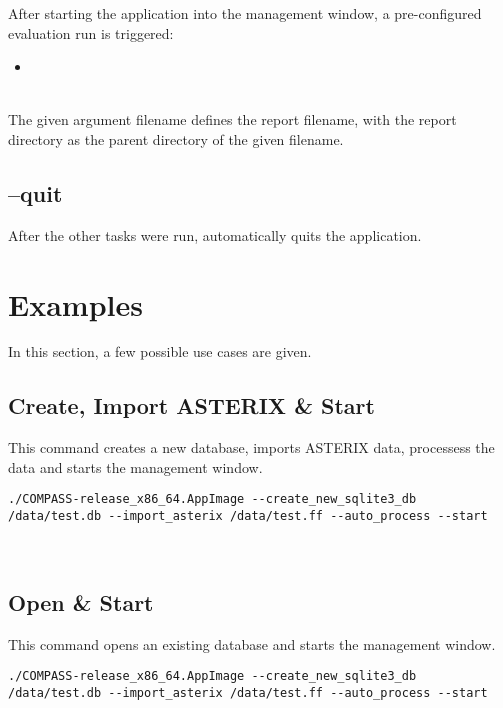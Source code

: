 After starting the application into the management window, a pre-configured evaluation run is triggered:

\begin{itemize}
 \item {}
\end{itemize}
\ \\

The given argument filename defines the report filename, with the report directory as the parent directory of the given filename.

\subsection{--quit}

After the other tasks were run, automatically quits the application.

\section{Examples}

In this section, a few possible use cases are given.

\subsection{Create, Import ASTERIX \& Start}

This command creates a new database, imports ASTERIX data, processess the data and starts the management window.

\begin{lstlisting}
./COMPASS-release_x86_64.AppImage --create_new_sqlite3_db /data/test.db --import_asterix /data/test.ff --auto_process --start
\end{lstlisting}
\ \\

\subsection{Open \& Start}

This command opens an existing database and starts the management window.

\begin{lstlisting}
./COMPASS-release_x86_64.AppImage --create_new_sqlite3_db /data/test.db --import_asterix /data/test.ff --auto_process --start
\end{lstlisting}
\ \\

